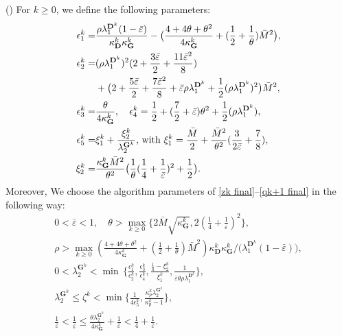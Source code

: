 \documentclass[12pt,draftcls,onecolumn]{IEEEtran}
\newcommand{\bG}{{\mathbf{G}}}
\newcommand{\bD}{{\mathbf{D}}}
\begin{document}
() For $k\geq 0$, we define the following parameters:
\begin{align}
		{\epsilon_1^k} =&  \frac{\rho \lambda_{1}^{\mathbf{D}^k}(1-\bar{\varepsilon})}{\kappa_{\mathbf{D}}^k\kappa_{\mathbf{G}}^k} -\big(\frac{4+4\theta+\theta^2}{4\kappa_{\mathbf{G}}^k}+(\frac{1}{2}+\frac{1}{\theta})\bar{M}^2\big),\notag\\
		{\epsilon_2^k} =& (\rho\lambda_{1}^{\mathbf{D}^k})^2(2+\frac{3\bar{\varepsilon}}{2}+\frac{11\bar{\varepsilon}^2}{8})\notag\\
		&+ \big(2+\frac{5\bar{\varepsilon}}{2}+\frac{7\bar{\varepsilon}^2}{8}+\bar{\varepsilon}\rho\lambda_{1}^{\mathbf{D}^k}+\frac{1}{2}(\rho\lambda_{1}^{\mathbf{D}^k})^2\big)\bar{M}^2, \notag\\
		{\epsilon_3^k} =&\frac{\theta}{4\kappa_\bG^k},\quad {\epsilon_4^k} = \frac{1}{2}+(\frac{7}{2}+\bar{\varepsilon})\theta^2+\frac{1}{2}(\rho\lambda_1^{\bD^k}),\notag\\
		{\epsilon_{5}^k} =& {\xi_1^k}+\frac{{\xi_2^k}}{\lambda_{2}^{\mathbf{G}^k}} \text{, with } {\xi_1^k} = \frac{\bar{M}}{2}+\frac{\bar{M}^2}{\theta^2}(\frac{3}{2\bar{\varepsilon}}+\frac{7}{8}), \notag\\
		{\xi_2^k} =& \frac{\kappa_{\mathbf{G}}^k\bar{M}^2}{\theta^2}\big(\frac{1}{\theta}(\frac{1}{4}+\frac{1}{\bar{\varepsilon}})^2+\frac{1}{2}\big). \label{epsilon1-epsilon5}
	\end{align}
Moreover, We choose the algorithm parameters of \eqref{zk final}--\eqref{qk+1 final} in the following way:
\begin{gather}
	0< \bar{\varepsilon}<1,\quad \theta>\max_{k\geq 0}\{2\bar{M}\sqrt{\kappa_\bG^k},2(\frac{1}{4}+\frac{1}{\bar{\varepsilon}})^2\},\label{range varepsilon theta}\\
	\rho > \max_{k\geq 0}{\left(\frac{4+4\theta+\theta^2}{4\kappa_{\mathbf{G}}^k}+(\frac{1}{2}+\frac{1}{\theta})\bar{M}^2\right)\kappa_{\mathbf{D}}^k\kappa_{\mathbf{G}}^k}/\big({\lambda_{1}^{\mathbf{D}^k}(1-\bar{\varepsilon})}\big),\label{range rho}\\
	0<  \lambda_{2}^{\mathbf{G}^k} <\min\, \{ \frac{{\epsilon_1^k}}{{\epsilon_2^k}}, \frac{{\epsilon_3^k}}{\epsilon_4^k}, \frac{\frac{1}{4}-{\xi_2^k}}{\xi_1^k},\frac{1}{\bar{\varepsilon}\theta\rho \lambda_{1}^{\mathbf{D}^k}}\}, \label{range hat lambda Gk}\\
	\lambda_{2}^{\mathbf{G}^k} \leq \zeta^k < \min \{\frac{1}{4{\epsilon_{5}^k}}, \frac{\kappa_p^k\lambda_{2}^{\mathbf{G}^k}}{\kappa_p^k-1}\}, \label{range zetak}\\
	\frac{1}{\bar{\varepsilon}}<\frac{1}{\underline{\varepsilon}}\leq\frac{\theta\lambda_2^{\bG^k}}{4\kappa_\bG^k}+\frac{1}{\bar{\varepsilon}}<\frac{1}{4}+\frac{1}{\bar{\varepsilon}}.\label{range underline varepsilon}
\end{gather}
\end{document}
